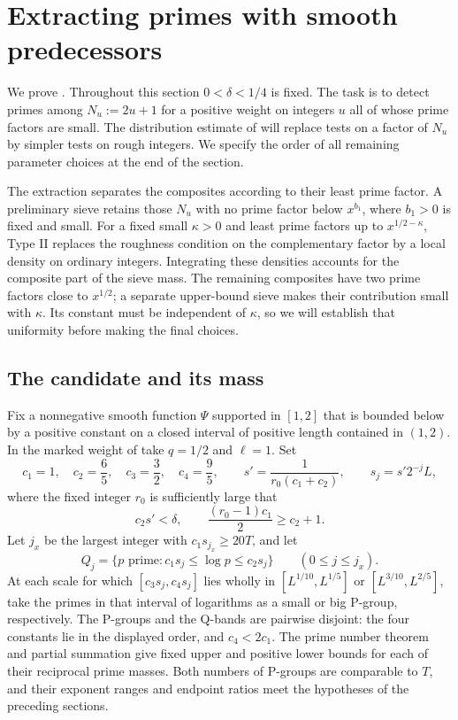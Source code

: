 \section{Extracting primes with smooth predecessors}\label{sec:primes}

We prove . Throughout this section $0<\delta<1/4$
is fixed. The task is to detect primes among $N_u:=2u+1$ for a positive
weight on integers $u$ all of whose prime factors are small. The
distribution estimate of  will replace tests on a factor
of $N_u$ by simpler tests on rough integers. We specify the order of all
remaining parameter choices at the end of the section.

The extraction separates the composites according to their least prime
factor. A preliminary sieve retains those $N_u$ with no prime factor
below $x^{b_1}$, where $b_1>0$ is fixed and small. For a fixed small
$\kappa>0$ and least prime factors up to $x^{1/2-\kappa}$, Type II
replaces the roughness condition on the complementary factor by a
local density on ordinary integers.
Integrating these densities accounts for the composite part of the
sieve mass. The remaining composites have two prime factors close to
$x^{1/2}$; a separate upper-bound sieve makes their contribution small
with $\kappa$. Its constant must be independent of $\kappa$, so we
will establish that uniformity before making the final choices.

\subsection{The candidate and its mass}

Fix a nonnegative smooth function $\Psi$ supported in $[1,2]$ that is
bounded below by a positive constant on a closed interval of positive
length contained in $(1,2)$. In the marked weight of 
take $q=1/2$ and $\ell=1$. Set
\[
 c_1=1,\quad c_2=\frac65,\quad c_3=\frac32,\quad c_4=\frac95,
 \qquad s'=\frac1{r_0(c_1+c_2)},\qquad s_j=s'2^{-j}L,
\]
where the fixed integer $r_0$ is sufficiently large that
\begin{equation}\label{eq:candidate-geometry}
 c_2s'<\delta,\qquad \frac{(r_0-1)c_1}{2}\ge c_2+1.
\end{equation}
Let $j_x$ be the largest integer with $c_1s_{j_x}\ge20T$, and let
\[
 Q_j=\{p\text{ prime}:c_1s_j\le\log p\le c_2s_j\}
 \qquad(0\le j\le j_x).
\]
At each scale for which $[c_3s_j,c_4s_j]$ lies wholly in
$[L^{1/10},L^{1/5}]$ or $[L^{3/10},L^{2/5}]$, take the primes in that
interval of logarithms as a small or big P-group, respectively.
The P-groups and the Q-bands are pairwise disjoint: the four constants
lie in the displayed order, and $c_4<2c_1$. The prime number theorem
and partial summation give fixed upper and positive lower bounds for
each of their reciprocal prime masses. Both numbers of P-groups are
comparable to $T$, and their exponent ranges and endpoint ratios meet
the hypotheses of the preceding sections.

